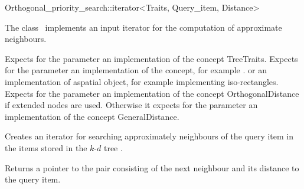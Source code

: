 

\begin{ccRefClass}{Orthogonal_priority_search::iterator<Traits, Query_item, Distance>}  %


\ccDefinition

The class \ccRefName\ implements an input iterator
for the computation of approximate neighbours.


\ccParameters

Expects for the parameter  an implementation of the concept TreeTraits.
Expects for the parameter   an implementation of the
 concept, for example .
or an implementation of aspatial object, for
example  implementing iso-rectangles.
Expects for the parameter  an implementation of the concept OrthogonalDistance if extended
nodes are used. Otherwise it expects for the parameter  an implementation of the
concept GeneralDistance.

\ccCreation
{}  %

{Creates an iterator for searching approximately neighbours of the query item 
in the items stored in the $k$-$d$ tree .}


{Returns a pointer to the pair consisting of the next neighbour and its distance
to the query item.}


\end{ccRefClass}
